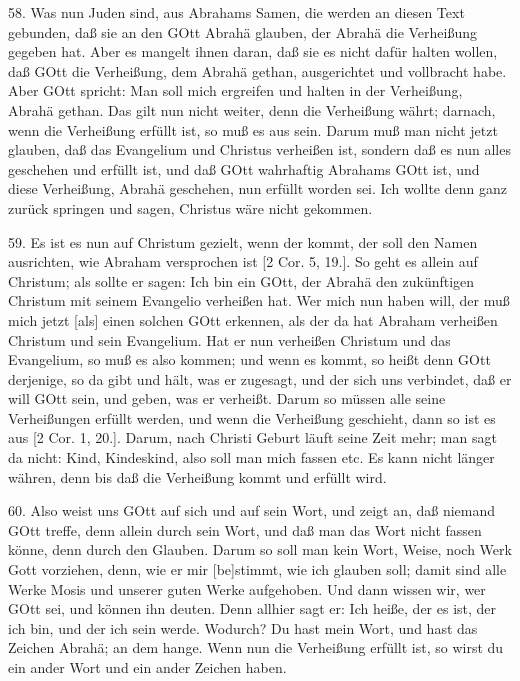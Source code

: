58. Was nun Juden sind, aus Abrahams Samen, die werden an diesen Text gebunden, daß sie an den GOtt Abrahä glauben, der Abrahä die Verheißung gegeben hat. Aber es mangelt ihnen daran, daß sie es nicht dafür halten wollen, daß GOtt die Verheißung, dem Abrahä gethan, ausgerichtet und vollbracht habe. Aber GOtt spricht: Man soll mich ergreifen und halten in der Verheißung, Abrahä gethan. Das gilt nun nicht weiter, denn die Verheißung währt; darnach, wenn die Verheißung erfüllt ist, so muß es aus sein. Darum muß man nicht jetzt glauben, daß das Evangelium und Christus verheißen ist, sondern daß es nun alles geschehen und erfüllt ist, und daß GOtt wahrhaftig Abrahams GOtt ist, und diese Verheißung, Abrahä geschehen, nun erfüllt worden sei. Ich wollte denn ganz zurück springen und sagen, Christus wäre nicht gekommen.

59. Es ist es nun auf Christum gezielt, wenn der kommt, der soll den Namen ausrichten, wie Abraham versprochen ist [2 Cor. 5, 19.]. So geht es allein auf Christum; als sollte er sagen: Ich bin ein GOtt, der Abrahä den zukünftigen Christum mit seinem Evangelio verheißen hat. Wer mich nun haben will, der muß mich jetzt [als] einen solchen GOtt erkennen, als der da hat Abraham verheißen Christum und sein Evangelium. Hat er nun verheißen Christum und das Evangelium, so muß es also kommen; und wenn es kommt, so heißt denn GOtt derjenige, so da gibt und hält, was er zugesagt, und der sich uns verbindet, daß er will GOtt sein, und geben, was er verheißt. Darum so müssen alle seine Verheißungen erfüllt werden, und wenn die Verheißung geschieht, dann so ist es aus [2 Cor. 1, 20.]. Darum, nach Christi Geburt läuft seine Zeit mehr; man sagt da nicht: Kind, Kindeskind, also soll man mich fassen etc. Es kann nicht länger währen, denn bis daß die Verheißung kommt und erfüllt wird.

60. Also weist uns GOtt auf sich und auf sein Wort, und zeigt an, daß niemand GOtt treffe, denn allein durch sein Wort, und daß man das Wort nicht fassen könne, denn durch den Glauben. Darum so soll man kein Wort, Weise, noch Werk Gott vorziehen, denn, wie er mir [be]stimmt, wie ich glauben soll; damit sind alle Werke Mosis und unserer guten Werke aufgehoben. Und dann wissen wir, wer GOtt sei, und können ihn deuten. Denn allhier sagt er: Ich heiße, der es ist, der ich bin, und der ich sein werde. Wodurch? Du hast mein Wort, und hast das Zeichen Abrahä; an dem hange. Wenn nun die Verheißung erfüllt ist, so wirst du ein ander Wort und ein ander Zeichen haben.

